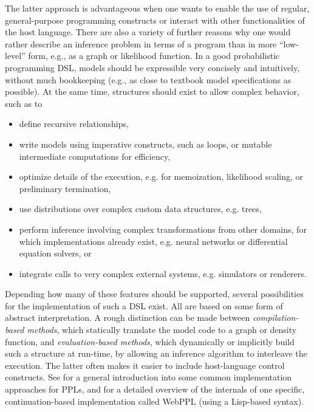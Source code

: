 The latter approach is advantageous when one wants to enable the use of regular, general-purpose
programming constructs or interact with other functionalities of the host language.  There are also
a variety of further reasons why one would rather describe an inference problem in terms of a
program than in more \enquote{low-level} form, e.g., as a graph or likelihood function.  In a good
probabilistic programming DSL, models should be expressible very concisely and intuitively, without
much bookkeeping (e.g., as close to textbook model specifications as possible).  At the same time,
structures should exist to allow complex behavior, such as to
\begin{itemize}
  \firmlist
\item define recursive relationships,
\item write models using imperative constructs, such as loops, or mutable intermediate computations
  for efficiency,
\item optimize details of the execution, e.g. for memoization, likelihood scaling, or preliminary
  termination,
\item use distributions over complex custom data structures, e.g. trees,
\item perform inference involving complex transformations from other domains, for which
  implementations already exist, e.g. neural networks or differential equation solvers, or
\item integrate calls to very complex external systems, e.g. simulators or renderers.
\end{itemize}
Depending how many of these features should be supported, several possibilities for the
implementation of such a DSL exist.  All are based on some form of abstract interpretation.  A rough
distinction can be made between \emph{compilation-based methods}, which statically translate the
model code to a graph or density function, and \emph{evaluation-based methods}, which dynamically or
implicitly build such a structure at run-time, by allowing an inference algorithm to interleave the
execution.  The latter often makes it easier to include host-language control constructs.  See
\textcite{vandemeent2018introduction} for a general introduction into some common implementation
approaches for PPLs, and \textcite{goodman2014design} for a detailed overview of the internals of
one specific, continuation-based implementation called WebPPL (using a Lisp-based syntax).

